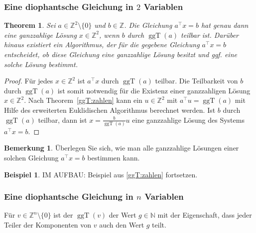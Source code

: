 \documentclass[
a4paper,12pt,
bibliography=totocnumbered,
numbers=noenddot,
]{scrartcl}
\numberwithin{equation}{subsection}
\newcommand{\N}{\mathbb N}
\newcommand{\Z}{\mathbb Z}
\newcommand{\ggT}{\operatorname{ggT}} %
\theoremstyle{plain}
\newtheorem*{thm}{Theorem}
\theoremstyle{definition}
\newtheorem*{bsp}{Beispiel}
\newtheorem*{bem}{Bemerkung}
\begin{document}
\subsubsection{Eine diophantsche Gleichung in $2$ Variablen} 

\begin{thm} 
	Sei $a \in \Z^2 \setminus \{0\}$ und $b \in \Z$. Die Gleichung $a^\top x = b$ hat genau dann eine ganzzahlige Lösung $x \in \Z^2$, wenn $b$ durch $\ggT(a)$ teilbar ist. Darüber hinaus existiert ein Algorithmus, der für die gegebene Gleichung $a^\top x = b$ entscheidet, ob diese Gleichung eine ganzzahlige Lösung besitzt und ggf. eine solche Lösung bestimmt. 
\end{thm} 
\begin{proof} 
	Für jedes $x \in \Z^2$ ist $a^\top x$ durch $\ggT(a)$ teilbar. Die Teilbarkeit von $b$ durch $\ggT(a)$ ist somit notwendig für die Existenz einer ganzzahligen Lösung $x \in \Z^2$. Nach Theorem~\ref{ggT:zahlen} kann ein  $u \in \Z^2$ mit $a^\top u = \ggT(a)$ mit Hilfe des erweiterten Euklidischen Algorithmus berechnet werden. Ist $b$ durch $\ggT(a)$ teilbar, dann ist $ x= \frac{b}{\ggT(a)} u$ eine ganzzahlige Lösung des Systems $a^\top x = b$. 
\end{proof} 

\begin{bem}
	Überlegen Sie sich, wie man alle ganzzahlige Lösungen einer solchen Gleichung $a^\top x = b$ bestimmen kann. 
\end{bem} 

\begin{bsp} 
	IM AUFBAU: Beispiel aus \ref{ggT:zahlen} fortsetzen. 
\end{bsp} 

\subsubsection{Eine diophantsche Gleichung in  $n$ Variablen} 

Für $v \in \Z^n \setminus \{0\}$ ist der $\ggT(v)$ der Wert $g \in \N$ mit der Eigenschaft, dass jeder Teiler der Komponenten von $v$ auch den Wert $g$ teilt. 
\end{document}
